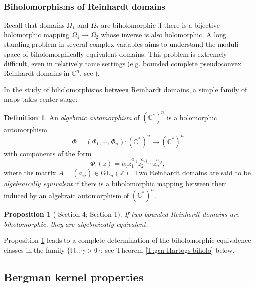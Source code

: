 \documentclass[letterpaper,11pt,reqno]{amsart}
\theoremstyle{plain}
\newtheorem{proposition}[equation]{Proposition}
\theoremstyle{definition}
\newtheorem{definition}[equation]{Definition}
\theoremstyle{remark}
\theoremstyle{remark}
\numberwithin{equation}{section}
\newcommand{\C}{{\mathbb C}}
\newcommand{\h}{{\mathbb H}}
\newcommand{\Z}{{\mathbb Z}}
\begin{document}
\subsubsection{Biholomorphisms of Reinhardt domains}

Recall that domains $\Omega_1$ and $\Omega_2$ are biholomorphic if there is a bijective holomorphic mapping $\Omega_1 \to \Omega_2$ whose inverse is also holomorphic.
A long standing problem in several complex variables aims to understand the moduli space of biholomorphically equivalent domains.
This problem is extremely difficult, even in relatively tame settings (e.g. bounded complete pseudoconvex Reinhardt domains in $\C^n$, see \cite{RongSTYau09,RongGaoYau10}).

In the study of biholomorphisms between Reinhardt domains, a simple family of maps takes center stage:

\begin{definition}\label{D:def-of-algebraic-equiv}
An {\em algebraic automorphism} of $(\C^*)^n$ is a holomorphic automorphism
\begin{equation*}
\Phi = (\Phi_1,\cdots,\Phi_n): (\C^*)^n \to (\C^*)^n
\end{equation*}
with components of the form
\begin{equation}
\Phi_j(z) = \alpha_j z_1^{a_{1j}} z_2^{a_{2j}}\cdots z_n^{a_{nj}},
\end{equation}
where the matrix $A = (a_{ij}) \in \mathrm{GL}_n(\Z)$.
Two Reinhardt domains are said to be {\em algebraically equivalent} if there is a biholomorphic mapping between them induced by an algebraic automorphism of $(\C^*)^n$.
\end{definition}


\begin{proposition}[\cite{Shim88} Section 4;  \cite{Kruz88} Section 1]\label{P:biholo=algequiv}
If two bounded Reinhardt domains are biholomorphic, they are algebraically equivalent.
\end{proposition}

Proposition \ref{P:biholo=algequiv} leads to a complete determination of the biholomorphic equivalence classes in the family $\{\h_\gamma: \gamma>0 \}$; see Theorem \ref{T:gen-Hartogs-biholo} below.

\subsection{Bergman kernel properties}\label{SS:BergKernProps}
\end{document}
